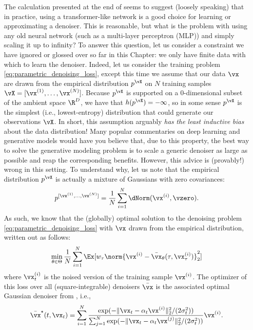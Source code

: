\documentclass[../../book-main.tex]{subfiles}
\begin{document}
The calculation presented at the end of
 seems to suggest (loosely
speaking) that in practice, using a transformer-like network is a
good choice for learning or approximating a denoiser. This is
reasonable, but what is the problem with using any old neural network
(such as a multi-layer perceptron (MLP)) and simply scaling it
up to infinity? To answer this question, let us consider a constraint
we have ignored or glossed over so far in this Chapter: we only
have finite data with which to learn the denoiser. Indeed, let us
consider the training problem \eqref{eq:parametric_denoising_loss},
except this time we assume that our data \(\vx\) are drawn from the
empirical distribution \(p^{\vX}\) on \(N\) training samples
\(\vX = [\vx^{(1)}, \dots, \vx^{(N)}]\). Because \(p^{\vX}\) is supported
on a \(0\)-dimensional subset of the ambient space \(\R^{D}\), we
have that \(h(p^{\vX}) = -\infty\), so in some sense \(p^{\vX}\) is
the simplest (i.e., lowest-entropy) distribution that could generate
our observations \(\vX\). In short, this assumption arguably \textit{has the
least inductive bias} about the data distribution! Many
popular commentaries on deep learning and generative models would
have you believe that, due to this property, the best way to solve
the generative modeling problem is to scale a generic denoiser
as large as possible and reap the corresponding
benefits. However, this advice is (provably!) wrong in this setting.
To understand why, let us note that the empirical distribution
\(p^{\vX}\) is actually a mixture of Gaussians with zero covariances:
\begin{equation}
    p^{[\vx^{(1)}, \dots, \vx^{(N)}]} = \frac{1}{N}\sum_{i =
    1}^{N}\dNorm(\vx^{(i)}, \vzero).
\end{equation}
As such, we know that the (globally) optimal solution to the
denoising problem \eqref{eq:parametric_denoising_loss} with \(\vx\)
drawn from the empirical distribution, written out as follows:
\begin{equation}\label{eq:parametric_denoising_loss_finite_sample}
    \min_{\theta \in \Theta}\frac{1}{N}\sum_{i =
    1}^{N}\Ex[w_{\tau}\norm{\vx^{(i)} - \bar{\vx}_{\theta}(\tau,
    \vx_{\tau}^{(i)})}_{2}^{2}]
\end{equation}
where \(\vx_{t}^{(i)}\) is the noised version of the training sample
\(\vx^{(i)}\). The optimizer of this loss over all
(square-integrable) denoisers \(\bar{\vx}\) is the associated optimal
Gaussian denoiser from , i.e.,
\begin{equation}\label{eq:memorizing_denoiser}
    \bar{\vx}^{\star}(t, \vx_{t}) = \sum_{i =
    1}^{N}\frac{\exp({-\|\vx_{t} -
    \alpha_{t}\vx^{(i)}\|_{2}^{2}/(2\sigma_{t}^{2})})}{\sum_{j =
        1}^{N}\exp({-\|\vx_{t} -
    \alpha_{t}\vx^{(j)}\|_{2}^{2}/(2\sigma_{t}^{2})})}\vx^{(i)}.
\end{equation}
\end{document}
